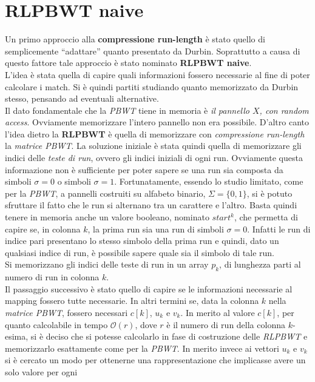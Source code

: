 \section{RLPBWT naive}
Un primo approccio alla \textbf{compressione run-length} è stato quello di
semplicemente ``adattare'' quanto presentato da Durbin. Soprattutto a causa di
questo fattore tale approccio è stato nominato \textbf{RLPBWT naive}.\\
L'idea è stata quella di capire quali informazioni fossero necessarie al fine di
poter calcolare i match. Si è quindi partiti studiando quanto memorizzato da
Durbin stesso, pensando ad eventuali alternative.\\
Il dato fondamentale che la \textit{PBWT} tiene in memoria è \textit{il pannello
  $X$, con random access}. Ovviamente memorizzare l'intero pannello non era
possibile. D'altro canto l'idea dietro la 
\textbf{RLPBWT} è quella di memorizzare con \textit{compressione run-length}
la \textit{matrice PBWT}. La soluzione iniziale è stata quindi quella di
memorizzare gli indici delle \textit{teste di run}, ovvero gli indici iniziali
di ogni run. Ovviamente questa informazione non è sufficiente per poter sapere
se una run sia composta da simboli $\sigma=0$ o simboli
$\sigma=1$. Fortunatamente, essendo lo studio limitato, come per la
\textit{PBWT}, a pannelli costruiti su alfabeto binario, $\Sigma=\{0,1\}$, si è
potuto sfruttare il fatto che le run si alternano tra un carattere e
l'altro. Basta quindi tenere in memoria anche un valore booleano, nominato
$start^k$, che permetta di 
capire se, in colonna $k$, la prima run sia una run di simboli
$\sigma=0$. Infatti le run di 
indice pari presentano lo stesso simbolo della prima run e quindi, dato un
qualsiasi indice di run, è possibile sapere quale sia il simbolo di tale run.\\
Si memorizzano gli indici delle teste di run in un array $p_k$, di lunghezza
parti al numero di run in colonna $k$.\\
Il passaggio successivo è stato quello di capire se le informazioni necessarie
al mapping fossero tutte necessarie. In altri termini se, data la colonna $k$
nella \textit{matrice PBWT}, fossero necessari $c[k]$, $u_k$ e $v_k$. In merito
al valore $c[k]$, per quanto calcolabile in tempo $\mathcal{O}(r)$, dove $r$ è
il numero di run della colonna $k$-esima, si è deciso che si potesse calcolarlo
in fase di costruzione delle \textit{RLPBWT} e memorizzarlo esattamente come per
la \textit{PBWT}. In merito invece ai vettori $u_k$ e $v_k$ si è cercato un modo
per ottenerne una rappresentazione che implicasse avere un solo valore per ogni
